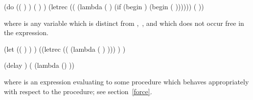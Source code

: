 \begin{schemenoindent}
(do ((  ) 
     \dotsfoo)
    ( )
   \dotsfoo)
\iet  (letrec ((
                (lambda ( \dotsfoo)
                  (if 
                      (begin )
                      (begin 
                             \dotsfoo
                             (  \dotsfoo))))))
        (  \dotsfoo))%
\end{schemenoindent}
where  is any variable which is distinct from
,~\dotsfoo, and which does not occur free in the 
expression.

\begin{schemenoindent}
(let  (( ) \dotsfoo)
  )
\iet  ((letrec (( (lambda ( \dotsfoo)
                             )))
          )
        \dotsfoo)

(delay )
\iet  ( (lambda () ))%
\end{schemenoindent}
where  is an expression evaluating to some procedure
which behaves appropriately with respect to the  procedure;
see section~\ref{force}.

